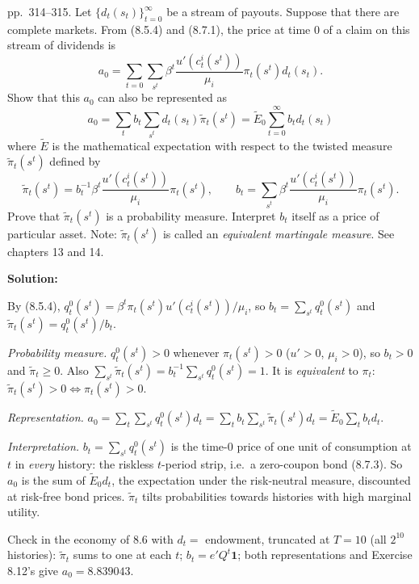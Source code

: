 \documentclass[12pt, letterpaper]{article}
\begin{document}
\begin{tcolorbox}[oddbox,title={Exercise 8.11 \quad Equivalent martingale measure}]
\begin{tcolorbox}[questionbox]
pp.~314--315. Let $\{d_t(s_t)\}_{t=0}^\infty$ be a stream of payouts. Suppose that there are complete markets.
From (8.5.4) and (8.7.1), the price at time 0 of a claim on this stream of dividends is
\[
a_0=\sum_{t=0}\sum_{s^t}\beta^t\frac{u'(c^i_t(s^t))}{\mu_i}\pi_t(s^t)d_t(s_t).
\]
Show that this $a_0$ can also be represented as
\[
a_0=\sum_tb_t\sum_{s^t}d_t(s_t)\tilde\pi_t(s^t)=\tilde E_0\sum_{t=0}^\infty b_td_t(s_t) \tag{1}
\]
where $\tilde E$ is the mathematical expectation with respect to the twisted measure $\tilde\pi_t(s^t)$
defined by
\[
\tilde\pi_t(s^t)=b_t^{-1}\beta^t\frac{u'(c^i_t(s^t))}{\mu_i}\pi_t(s^t),\qquad
b_t=\sum_{s^t}\beta^t\frac{u'(c^i_t(s^t))}{\mu_i}\pi_t(s^t).
\]
Prove that $\tilde\pi_t(s^t)$ is a probability measure. Interpret $b_t$ itself as a price of particular asset.
Note: $\tilde\pi_t(s^t)$ is called an \emph{equivalent martingale measure}. See chapters 13 and 14.
\end{tcolorbox}

\textbf{Solution:}

By (8.5.4), $q^0_t(s^t)=\beta^t\pi_t(s^t)u'(c^i_t(s^t))/\mu_i$, so $b_t=\sum_{s^t}q^0_t(s^t)$ and
$\tilde\pi_t(s^t)=q^0_t(s^t)/b_t$.

\emph{Probability measure.} $q^0_t(s^t)>0$ whenever $\pi_t(s^t)>0$ ($u'>0$, $\mu_i>0$), so $b_t>0$ and
$\tilde\pi_t\ge0$. Also $\sum_{s^t}\tilde\pi_t(s^t)=b_t^{-1}\sum_{s^t}q^0_t(s^t)=1$. It is \emph{equivalent} to $\pi_t$:
$\tilde\pi_t(s^t)>0\iff\pi_t(s^t)>0$.

\emph{Representation.} $a_0=\sum_t\sum_{s^t}q^0_t(s^t)d_t=\sum_tb_t\sum_{s^t}\tilde\pi_t(s^t)d_t=\tilde E_0\sum_tb_td_t$.

\emph{Interpretation.} $b_t=\sum_{s^t}q^0_t(s^t)$ is the time-0 price of one unit of consumption at $t$ in
\emph{every} history: the riskless $t$-period strip, i.e.\ a zero-coupon bond (8.7.3). So $a_0$ is the sum
of $\tilde E_0d_t$, the expectation under the risk-neutral measure, discounted at risk-free bond prices.
$\tilde\pi_t$ tilts probabilities towards histories with high marginal utility.

\begin{tcolorbox}[databox]
Check in the economy of 8.6 with $d_t=$ endowment, truncated at $T=10$ (all $2^{10}$ histories): $\tilde\pi_t$ sums to one at
each $t$; $b_t=e'Q^t\mathbf 1$; both representations and Exercise 8.12's give $a_0=8.839043$.
\end{tcolorbox}
\end{tcolorbox}
\end{document}
